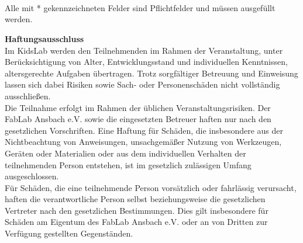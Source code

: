 \begin{Form}
	 	 \\
	 	 \\
	 	 \\

\end{Form}

\begin{Form}
	\renewcommand{\baselinestretch}{1.2}\selectfont
	\setlength{\parskip}{0.4ex}
	\hfill {}
\end{Form}

\vfill
{\small Alle mit * gekennzeichneten Felder sind Pflichtfelder und müssen ausgefüllt werden.}

\newpage
\renewcommand{\baselinestretch}{1.35}\selectfont
\setlength{\parskip}{0.6ex}
{\Large\textbf{Haftungsausschluss}} \\
Im KidsLab werden den Teilnehmenden im Rahmen der Veranstaltung, unter Berücksichtigung von Alter, Entwicklungsstand und individuellen Kenntnissen, altersgerechte Aufgaben übertragen. Trotz sorgfältiger Betreuung und Einweisung lassen sich dabei Risiken sowie Sach- oder Personenschäden nicht vollständig ausschließen. \\

Die Teilnahme erfolgt im Rahmen der üblichen Veranstaltungsrisiken. Der FabLab Ansbach e.V. sowie die eingesetzten Betreuer haften nur nach den gesetzlichen Vorschriften. Eine Haftung für Schäden, die insbesondere aus der Nichtbeachtung von Anweisungen, unsachgemäßer Nutzung von Werkzeugen, Geräten oder Materialien oder aus dem individuellen Verhalten der teilnehmenden Person entstehen, ist im gesetzlich zulässigen Umfang ausgeschlossen. \\

Für Schäden, die eine teilnehmende Person vorsätzlich oder fahrlässig verursacht, haften die verantwortliche Person selbst beziehungsweise die gesetzlichen Vertreter nach den gesetzlichen Bestimmungen. Dies gilt insbesondere für Schäden am Eigentum des FabLab Ansbach e.V. oder an von Dritten zur Verfügung gestellten Gegenständen.\\

